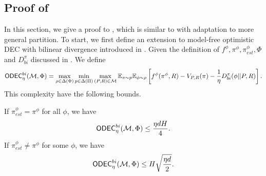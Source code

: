 \subsection{Proof of }\label{app: odec}
In this section, we give a proof to , which is similar to \cite{foster2024model} with adaptation to more general partition. To start, we first define an extension to model-free optimistic DEC with bilinear divergence introduced in \cite{foster2024model}.  Given the definition of $f^\phi, \pi^\phi, \pi^\phi_{est}, \Phi$ and $D_{bi}^\pi$ discussed in . We define
\begin{align*}
    \mathsf{ODEC}_{\eta}^{bi}(\mathcal{M}, \Phi) = \max_{\rho \in \Delta(\Phi)}\min_{p \in \Delta(\Pi)}\max_{(P,R) \in \mathcal{M}}\mathbb{E}_{\pi \sim p}\mathbb{E}_{\phi \sim \rho}\left[f^{\phi}(\pi^\phi, R) - V_{P,R}(\pi)  - \frac{1}{\eta} D_{bi}^{\pi}(\phi||P, R)\right].
\end{align*}
This complexity have the following bounds.  
\begin{lemma}
If $\pi^{\phi}_{est} = \pi^{\phi}$ for all $\phi$, we have
\begin{align*}
     \mathsf{ODEC}_{\eta}^{bi}(\mathcal{M}, \Phi) \le \frac{\eta dH}{4}. 
\end{align*}
If $\pi^{\phi}_{est} \neq \pi^{\phi}$ for some $\phi$,  we have
\begin{align*}
     \mathsf{ODEC}_{\eta}^{bi}(\mathcal{M}, \Phi) \le H\sqrt{\frac{\eta d}{2}}. 
\end{align*}
\label{lem:odec-bound}
\end{lemma}

